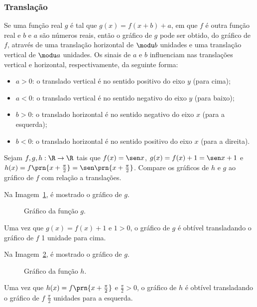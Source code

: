 \subsubsection{Translação}

Se uma função real $g$ é tal que $g(x) = f(x+b) +a$, em que $f$ é outra função real e $b$ e $a$ são números reais,
então o gráfico de $g$ pode ser obtido, do gráfico de $f$, através
de uma translação horizontal de $\modu b$ unidades e uma
translação vertical de $\modu a$ unidades.
Os sinais de $a$ e $b$ influenciam nas translações vertical e horizontal, respectivamente, da seguinte forma:

\begin{itemize}
  \item $a > 0$: o translado vertical é no sentido positivo do eixo $y$ (para cima);
  \item $a < 0$: o translado vertical é no sentido negativo do eixo $y$ (para baixo);
  \item $b > 0$: o translado horizontal é no sentido negativo do eixo $x$ (para a esquerda);
  \item $b < 0$: o translado horizontal é no sentido positivo do eixo $x$ (para a direita).
\end{itemize}

\begin{example}
Sejam $f,g,h:\R \to \R$ tais que $f(x) = \sen x$, $g(x) = f(x) + 1 = \sen x +1$ e $h(x)= f\prn{x+\frac {\pi} 2}= \sen \prn{x+ \frac {\pi} 2}$.
Compare os gráficos de $h$ e $g$ ao gráfico de $f$ com relação a translações.
\end{example}

\begin{solution}
Na Imagem~\ref{img:grafico-translacao-exemplo-g}, é mostrado o gráfico de $g$.
%
  \begin{figure}
    \centering
    
    \caption{Gráfico da função $g$.}
    \label{img:grafico-translacao-exemplo-g}
  \end{figure}
%
\noindent Uma vez que $g(x) = f(x)+1$ e $1>0$, o gráfico de $g$ é obtível transladando o gráfico de $f$ 1 unidade para cima.

Na Imagem~\ref{img:grafico-translacao-exemplo-h}, é mostrado o gráfico de $g$.
%
  \begin{figure}
    \centering
    
    \caption{Gráfico da função $h$.}
    \label{img:grafico-translacao-exemplo-h}
  \end{figure}
%
\noindent Uma vez que $h(x) = f\prn{x+\frac {\pi} 2}$ e $\frac {\pi} 2>0$, o gráfico de $h$ é obtível transladando o gráfico de $f$ $\frac {\pi} 2$ unidades para a esquerda.
\end{solution}    